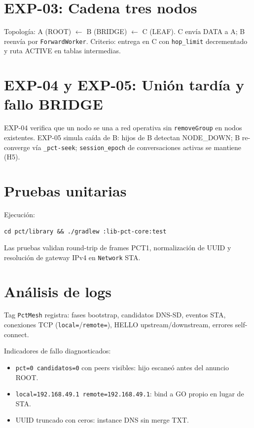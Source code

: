 \section{EXP-03: Cadena tres nodos}
\label{sec:resultados-exp03}

Topología: A (ROOT) $\leftarrow$ B (BRIDGE) $\leftarrow$ C (LEAF). C envía DATA a A; B reenvía por \texttt{ForwardWorker}. Criterio: entrega en C con \texttt{hop\_limit} decrementado y ruta ACTIVE en tablas intermedias.

\section{EXP-04 y EXP-05: Unión tardía y fallo BRIDGE}
\label{sec:exp04-exp05}

EXP-04 verifica que un nodo se una a red operativa sin \texttt{removeGroup} en nodos existentes. EXP-05 simula caída de B: hijos de B detectan NODE\_DOWN; B re-converge vía \texttt{\_pct-seek}; \texttt{session\_epoch} de conversaciones activas se mantiene (H5).

\section{Pruebas unitarias}
\label{sec:pruebas-unitarias}

Ejecución:
\begin{verbatim}
cd pct/library && ./gradlew :lib-pct-core:test
\end{verbatim}

Las pruebas validan round-trip de frames PCT1, normalización de UUID y resolución de gateway IPv4 en \texttt{Network} STA.

\section{Análisis de logs}
\label{sec:analisis-logs}

Tag \texttt{PctMesh} registra: fases bootstrap, candidatos DNS-SD, eventos STA, conexiones TCP (\texttt{local=}/\texttt{remote=}), HELLO upstream/downstream, errores self-connect.

Indicadores de fallo diagnosticados:
\begin{itemize}
  \item \texttt{pct=0 candidatos=0} con peers visibles: hijo escaneó antes del anuncio ROOT.
  \item \texttt{local=192.168.49.1 remote=192.168.49.1}: bind a GO propio en lugar de STA.
  \item UUID truncado con ceros: instance DNS sin merge TXT.
\end{itemize}

